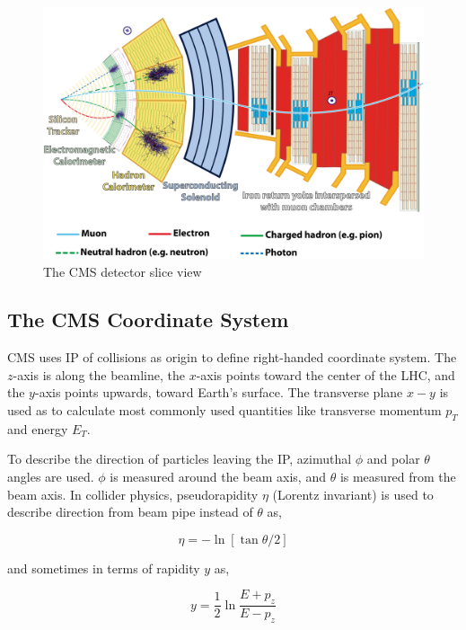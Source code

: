 \begin{figure}[!ht]
  \centering
  \includegraphics[width=\textwidth]{figures/cms_slice.png}
  \caption[The CMS detector slice view]%
  {The CMS detector slice view~\cite{image-cms-slice}}%
  \label{fig:cms-slice}
\end{figure}

\subsection{
  The CMS Coordinate System
}\label{ch_cms:cms-coordinate}

CMS uses \gls{IP} of collisions as origin to define right-handed
coordinate system. The \( z \)-axis is along the beamline,
the \( x \)-axis points toward the center of the \gls{LHC},
and the \( y \)-axis points upwards, toward Earth's surface.
The transverse plane \( x - y \) is used as to calculate
most commonly used quantities like transverse momentum \( p_{T} \)
and energy \( E_{T} \).

To describe the direction of particles leaving the \gls{IP},
azimuthal \( \phi \) and polar \( \theta \) angles are used.
\( \phi \) is measured around the beam axis,
and \( \theta \) is measured from the beam axis.
In collider physics, pseudorapidity \( \eta \) (Lorentz invariant) is used
to describe direction from beam pipe instead of \( \theta \) as,

\begin{equation}
  \eta = - \ln[\tan{\theta/2}]
\end{equation}

and sometimes in terms of rapidity \( y \) as,

\begin{equation}
  y = \frac{1}{2} \ln{\frac{E+p_{z}}{E-p_{z}}}
\end{equation}

